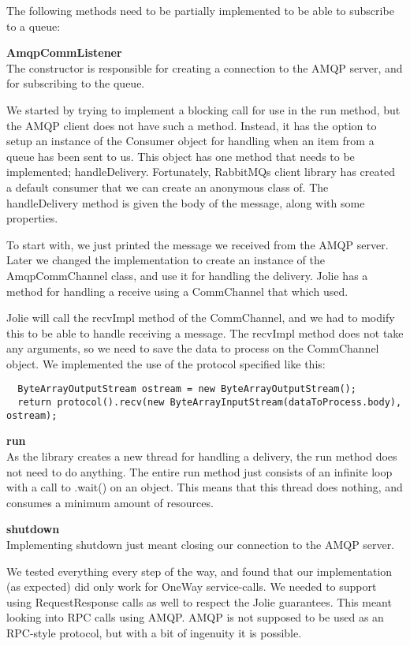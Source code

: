The following methods need to be partially implemented to be able to subscribe to a queue:

\noindent\textbf{AmqpCommListener}\\
The constructor is responsible for creating a connection to the AMQP server, and for subscribing to the queue.

We started by trying to implement a blocking call for use in the run method, but the AMQP client does not have such a method. Instead, it has the option to setup an instance of the Consumer object for handling when an item from a queue has been sent to us. This object has one method that needs to be implemented; handleDelivery. Fortunately, RabbitMQs client library has created a default consumer that we can create an anonymous class of. The handleDelivery method is given the body of the message, along with some properties.

To start with, we just printed the message we received from the AMQP server. Later we changed the implementation to create an instance of the AmqpCommChannel class, and use it for handling the delivery. Jolie has a method for handling a receive using a CommChannel that which used.

Jolie will call the recvImpl method of the CommChannel, and we had to modify this to be able to handle receiving a message. The recvImpl method does not take any arguments, so we need to save the data to process on the CommChannel object. We implemented the use of the protocol specified like this:
\begin{lstlisting}
  ByteArrayOutputStream ostream = new ByteArrayOutputStream();
  return protocol().recv(new ByteArrayInputStream(dataToProcess.body), ostream);
\end{lstlisting}

\noindent\textbf{run}\\
As the library creates a new thread for handling a delivery, the run method does not need to do anything. The entire run method just consists of an infinite loop with a call to .wait() on an object. This means that this thread does nothing, and consumes a minimum amount of resources.

\noindent\textbf{shutdown}\\
Implementing shutdown just meant closing our connection to the AMQP server.

We tested everything every step of the way, and found that our implementation (as expected) did only work for OneWay service-calls. We needed to support using RequestResponse calls as well to respect the Jolie guarantees. This meant looking into RPC calls using AMQP. AMQP is not supposed to be used as an RPC-style protocol, but with a bit of ingenuity it is possible.

